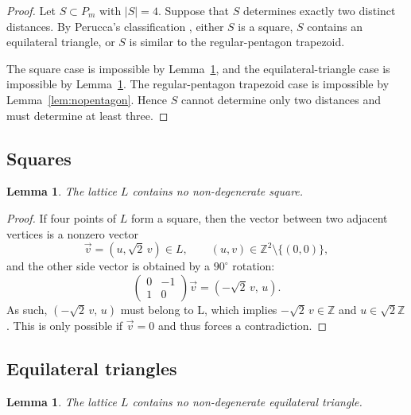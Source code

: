 \documentclass[11pt, reqno]{amsart}
\newtheorem{lemma}[theorem]{Lemma}
\theoremstyle{definition}
\theoremstyle{remark}
\newcommand{\Z}{\mathbb{Z}}
\begin{document}
\begin{proof}
Let $S\subset P_m$ with $|S|=4$. Suppose that $S$ determines exactly two distinct distances.
By Perucca's classification \cite{perucca4points}, either $S$ is a square, $S$ contains an equilateral triangle, or $S$ is
similar to the regular-pentagon trapezoid.

The square case is impossible by Lemma~\ref{lem:nosquare}, and the equilateral-triangle case is impossible by
Lemma~\ref{lem:noequilateral}. The regular-pentagon trapezoid case is impossible by Lemma~\ref{lem:nopentagon}.
Hence $S$ cannot determine only two distances and must determine at least three.
\end{proof}

\subsection{Squares}

\begin{lemma}\label{lem:nosquare}
The lattice $L$ contains no non-degenerate square.
\end{lemma}

\begin{proof}
If four points of $L$ form a square, then the vector between two adjacent vertices is a nonzero vector
\[
 \vec v=(u,\sqrt2\,v)\in L,\qquad (u,v)\in\Z^2\setminus\{(0,0)\},
\]
and the other side vector is obtained by a $90^\circ$ rotation:
\[
 \begin{pmatrix} 0 & -1\\[2pt] 1 & 0\end{pmatrix} \vec v = (-\sqrt2\,v,\,u).
\]
As such, $(-\sqrt2\,v,\,u)$ must belong to L, which implies $-\sqrt2\,v \in \Z$ and $u\in\sqrt{2}\Z $. This is only possible if $ \vec v = 0$ 
and thus forces a contradiction.
\end{proof}

\subsection{Equilateral triangles}

\begin{lemma}\label{lem:noequilateral}
The lattice $L$ contains no non-degenerate equilateral triangle.
\end{lemma}
\end{document}
